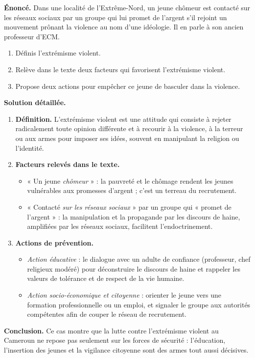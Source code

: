 \documentclass[11pt]{article}
\begin{document}
\begin{exoresolu}
\textbf{Énoncé.} Dans une localité de l'Extrême-Nord, un jeune chômeur est contacté sur les réseaux sociaux par un groupe qui lui promet de l'argent s'il rejoint un mouvement prônant la violence au nom d'une idéologie. Il en parle à son ancien professeur d'ECM.
\begin{enumerate}
\item Définis l'extrémisme violent.
\item Relève dans le texte deux facteurs qui favorisent l'extrémisme violent.
\item Propose deux actions pour empêcher ce jeune de basculer dans la violence.
\end{enumerate}
\tcblower
\textbf{Solution détaillée.}
\begin{enumerate}
\item \textbf{Définition.} L'extrémisme violent est une attitude qui consiste à rejeter radicalement toute opinion différente et à recourir à la violence, à la terreur ou aux armes pour imposer ses idées, souvent en manipulant la religion ou l'identité.
\item \textbf{Facteurs relevés dans le texte.}
\begin{itemize}
\item « Un jeune \emph{chômeur} » : la pauvreté et le chômage rendent les jeunes vulnérables aux promesses d'argent ; c'est un terreau du recrutement.
\item « Contacté \emph{sur les réseaux sociaux} » par un groupe qui « promet de l'argent » : la manipulation et la propagande par les discours de haine, amplifiées par les réseaux sociaux, facilitent l'endoctrinement.
\end{itemize}
\item \textbf{Actions de prévention.}
\begin{itemize}
\item \emph{Action éducative} : le dialogue avec un adulte de confiance (professeur, chef religieux modéré) pour déconstruire le discours de haine et rappeler les valeurs de tolérance et de respect de la vie humaine.
\item \emph{Action socio-économique et citoyenne} : orienter le jeune vers une formation professionnelle ou un emploi, et signaler le groupe aux autorités compétentes afin de couper le réseau de recrutement.
\end{itemize}
\end{enumerate}
\textbf{Conclusion.} Ce cas montre que la lutte contre l'extrémisme violent au Cameroun ne repose pas seulement sur les forces de sécurité : l'éducation, l'insertion des jeunes et la vigilance citoyenne sont des armes tout aussi décisives.
\end{exoresolu}
\end{document}
